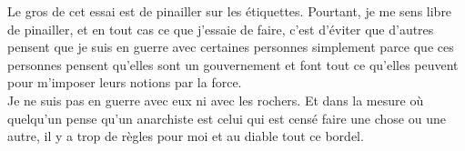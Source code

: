 Le gros de cet essai est de pinailler sur les étiquettes. Pourtant, je me sens libre de pinailler, et en tout cas ce que j'essaie de faire, c'est d'éviter que d'autres pensent que je suis en guerre avec certaines personnes simplement parce que ces personnes pensent qu'elles sont un gouvernement et font tout ce qu'elles peuvent pour m'imposer leurs notions par la force.\\
Je ne suis pas en guerre avec eux ni avec les rochers. Et dans la mesure où quelqu'un pense qu'un anarchiste est celui qui est censé faire une chose ou une autre, il y a trop de règles pour moi et au diable tout ce bordel.